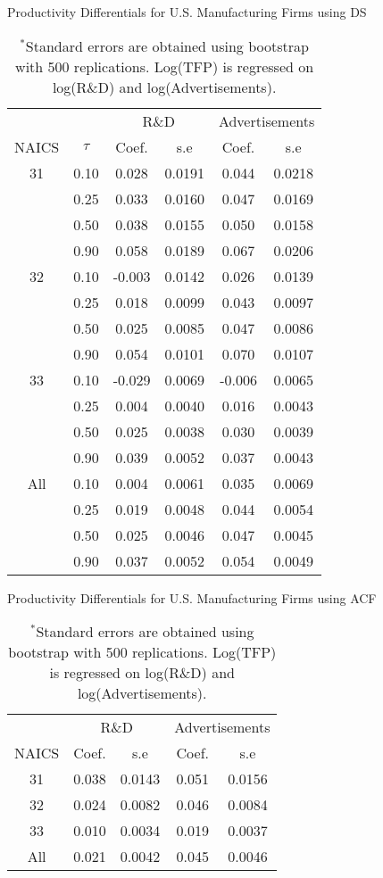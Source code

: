 \documentclass[12pt]{article}
\begin{document}
\begin{table}[H]
\centering
\caption{Productivity Differentials for U.S. Manufacturing Firms using DS}
\small
\begin{tabular}{cccccc}
  \hline\hline & & \multicolumn{2}{c}{R\&D}  & \multicolumn{2}{c}{Advertisements} \\ \cmidrule(lr){3-4} \cmidrule(lr){5-6}NAICS & $\tau$ & Coef. & s.e & Coef. & s.e \\ 
  \hline
31 & 0.10 & 0.028 & 0.0191 & 0.044 & 0.0218 \\ 
   & 0.25 & 0.033 & 0.0160 & 0.047 & 0.0169 \\ 
   & 0.50 & 0.038 & 0.0155 & 0.050 & 0.0158 \\ 
   & 0.90 & 0.058 & 0.0189 & 0.067 & 0.0206 \\ 
  32 & 0.10 & -0.003 & 0.0142 & 0.026 & 0.0139 \\ 
   & 0.25 & 0.018 & 0.0099 & 0.043 & 0.0097 \\ 
   & 0.50 & 0.025 & 0.0085 & 0.047 & 0.0086 \\ 
   & 0.90 & 0.054 & 0.0101 & 0.070 & 0.0107 \\ 
  33 & 0.10 & -0.029 & 0.0069 & -0.006 & 0.0065 \\ 
   & 0.25 & 0.004 & 0.0040 & 0.016 & 0.0043 \\ 
   & 0.50 & 0.025 & 0.0038 & 0.030 & 0.0039 \\ 
   & 0.90 & 0.039 & 0.0052 & 0.037 & 0.0043 \\ 
  All & 0.10 & 0.004 & 0.0061 & 0.035 & 0.0069 \\ 
   & 0.25 & 0.019 & 0.0048 & 0.044 & 0.0054 \\ 
   & 0.50 & 0.025 & 0.0046 & 0.047 & 0.0045 \\ 
   & 0.90 & 0.037 & 0.0052 & 0.054 & 0.0049 \\ 
   \hline
\end{tabular}
\caption*{\footnotesize $^{*}$Standard errors are obtained using bootstrap with 500 replications. Log(TFP) is regressed on log(R\&D) and log(Advertisements).}
\label{QACFUSTFPP}
\end{table}

\begin{table}[H]
\centering
\caption{Productivity Differentials for U.S. Manufacturing Firms using ACF}
\small
\begin{tabular}{ccccc}
  \hline\hline & \multicolumn{2}{c}{R\&D}  & \multicolumn{2}{c}{Advertisements} \\ \cmidrule(lr){2-3} \cmidrule(lr){4-5}NAICS & Coef. & s.e & Coef. & s.e \\ 
  \hline
31 & 0.038 & 0.0143 & 0.051 & 0.0156 \\ 
  32 & 0.024 & 0.0082 & 0.046 & 0.0084 \\ 
  33 & 0.010 & 0.0034 & 0.019 & 0.0037 \\ 
  All & 0.021 & 0.0042 & 0.045 & 0.0046 \\ 
   \hline
\end{tabular}
\caption*{\footnotesize $^{*}$Standard errors are obtained using bootstrap with 500 replications. Log(TFP) is regressed on log(R\&D) and log(Advertisements).}
\label{ACFUSTFPP}
\end{table}
\end{document}
